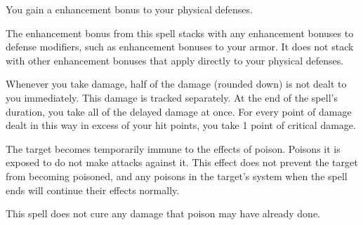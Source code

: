 \begin{spellheader}
    \spelldur{\durlong}
\end{spellheader}
\begin{spelleffects}
    \spelleffect You gain a  enhancement bonus to your physical defenses. \spellbonusscalingdescription
\end{spelleffects}
\begin{spellfooter}
    \spellnotes The enhancement bonus from this spell stacks with any enhancement bonuses to defense modifiers, such as enhancement bonuses to your armor. It does not stack with other enhancement bonuses that apply directly to your physical defenses. 
\end{spellfooter}

\begin{spellheader}
    \spelldur{\durmed}
\end{spellheader}
\begin{spelleffects}
    \spelleffect Whenever you take damage, half of the damage (rounded down) is not dealt to you immediately. This damage is tracked separately. At the end of the spell's duration, you take all of the delayed damage at once. For every point of damage dealt in this way in excess of your hit points, you take 1 point of critical damage.
\end{spelleffects}
\begin{spellfooter}

\end{spellfooter}

\begin{spellheader}
    \spellrng{\rngclose}
    \spelldur{\durshort}
\end{spellheader}
\begin{spelleffects}
    \spelleffect The target becomes temporarily immune to the effects of poison. Poisons it is exposed to do not make attacks against it. This effect does not prevent the target from becoming poisoned, and any poisons in the target's system when the spell ends will continue their effects normally. 
\end{spelleffects}
\begin{spellfooter}
    \spellnotes This spell does not cure any damage that poison may have already done.
\end{spellfooter}

